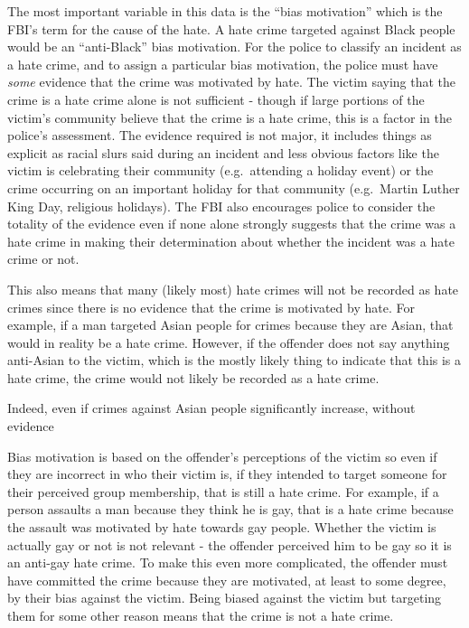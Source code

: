\documentclass[
  12pt,
  openany]{book}
\begin{document}
The most important variable in this data is the ``bias motivation'' which is the FBI's term for the cause of the hate. A hate crime targeted against Black people would be an ``anti-Black'' bias motivation. For the police to classify an incident as a hate crime, and to assign a particular bias motivation, the police must have \emph{some} evidence that the crime was motivated by hate. The victim saying that the crime is a hate crime alone is not sufficient - though if large portions of the victim's community believe that the crime is a hate crime, this is a factor in the police's assessment. The evidence required is not major, it includes things as explicit as racial slurs said during an incident and less obvious factors like the victim is celebrating their community (e.g.~attending a holiday event) or the crime occurring on an important holiday for that community (e.g.~Martin Luther King Day, religious holidays). The FBI also encourages police to consider the totality of the evidence even if none alone strongly suggests that the crime was a hate crime in making their determination about whether the incident was a hate crime or not.

This also means that many (likely most) hate crimes will not be recorded as hate crimes since there is no evidence that the crime is motivated by hate. For example, if a man targeted Asian people for crimes because they are Asian, that would in reality be a hate crime. However, if the offender does not say anything anti-Asian to the victim, which is the mostly likely thing to indicate that this is a hate crime, the crime would not likely be recorded as a hate crime.

Indeed, even if crimes against Asian people significantly increase, without evidence

Bias motivation is based on the offender's perceptions of the victim so even if they are incorrect in who their victim is, if they intended to target someone for their perceived group membership, that is still a hate crime. For example, if a person assaults a man because they think he is gay, that is a hate crime because the assault was motivated by hate towards gay people. Whether the victim is actually gay or not is not relevant - the offender perceived him to be gay so it is an anti-gay hate crime. To make this even more complicated, the offender must have committed the crime because they are motivated, at least to some degree, by their bias against the victim. Being biased against the victim but targeting them for some other reason means that the crime is not a hate crime.
\end{document}
